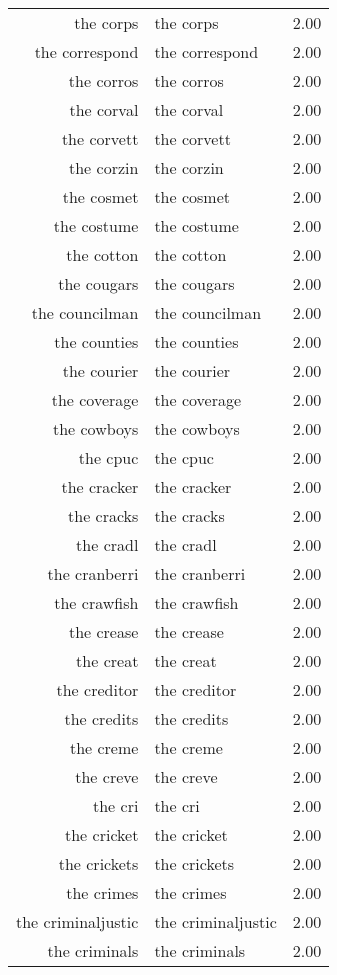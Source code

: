 \begin{table}[ht]
\begin{tabular}{rlr}
  the corps & the corps & 2.00 \\ 
  the correspond & the correspond & 2.00 \\ 
  the corros & the corros & 2.00 \\ 
  the corval & the corval & 2.00 \\ 
  the corvett & the corvett & 2.00 \\ 
  the corzin & the corzin & 2.00 \\ 
  the cosmet & the cosmet & 2.00 \\ 
  the costume & the costume & 2.00 \\ 
  the cotton & the cotton & 2.00 \\ 
  the cougars & the cougars & 2.00 \\ 
  the councilman & the councilman & 2.00 \\ 
  the counties & the counties & 2.00 \\ 
  the courier & the courier & 2.00 \\ 
  the coverage & the coverage & 2.00 \\ 
  the cowboys & the cowboys & 2.00 \\ 
  the cpuc & the cpuc & 2.00 \\ 
  the cracker & the cracker & 2.00 \\ 
  the cracks & the cracks & 2.00 \\ 
  the cradl & the cradl & 2.00 \\ 
  the cranberri & the cranberri & 2.00 \\ 
  the crawfish & the crawfish & 2.00 \\ 
  the crease & the crease & 2.00 \\ 
  the creat & the creat & 2.00 \\ 
  the creditor & the creditor & 2.00 \\ 
  the credits & the credits & 2.00 \\ 
  the creme & the creme & 2.00 \\ 
  the creve & the creve & 2.00 \\ 
  the cri & the cri & 2.00 \\ 
  the cricket & the cricket & 2.00 \\ 
  the crickets & the crickets & 2.00 \\ 
  the crimes & the crimes & 2.00 \\ 
  the criminaljustic & the criminaljustic & 2.00 \\ 
  the criminals & the criminals & 2.00 \\ 

\end{tabular}
\end{table}
